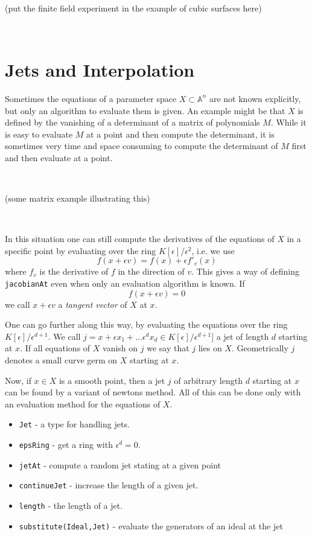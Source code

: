 \documentclass[12pt,a4paper]{amsart}
\theoremstyle{plain}
\theoremstyle{definition}
\renewcommand{\AA}{\mathbb A}
\begin{document}
\

{\color{red} (put the finite field experiment in the example of cubic surfaces here)}

\


\section{Jets and Interpolation}

Sometimes the equations of a parameter space $X \subset \AA^n$ are not known explicitly, but only an algorithm to evaluate them is given. An example might be that $X$ is defined by the vanishing of a determinant of a matrix  of polynomials $M$. While it is easy to evaluate $M$ at a point and then compute the determinant, it is sometimes very time and space consuming to compute the determinant of $M$ first and then evaluate at a point.

\

{\color{red} (some matrix example illustrating this)}

\

In this situation one can still compute the derivatives of the equations of $X$ in a specific point by evaluating over the ring $K[\epsilon]/\epsilon^2$, i.e. we use
\[
	f(x + \epsilon v) = f(x) + \epsilon f'_v(x)
\]
where $f_v$ is the derivative of $f$ in the direction of $v$. This gives a way of defining {\tt jacobianAt} even when only an evaluation algorithm is known. If
\[
	f(x + \epsilon v) = 0
\]
we call $x + \epsilon v$ a {\sl tangent vector} of $X$ at $x$.

One can go further along this way, by evaluating the equations over the ring $K[\epsilon]/\epsilon^{d+1}$. 
We call $j = x + \epsilon x_1 + \dots \epsilon^d x_d \in K[\epsilon]/\epsilon^{d+1}]$ a jet of length $d$ starting at $x$. 
If all equations of $X$ vanish on $j$ we say that $j$ lies on $X$. Geometrically $j$ denotes a small curve germ on $X$ starting at $x$.

Now, if $x \in X$ is a smooth point, then a jet $j$ of arbitrary length $d$ starting at $x$ can be found by a variant of newtons method. All of this can be done only with an evaluation method for the equations of $X$. 

\begin{itemize}
\item {\tt Jet} - a type for handling jets.
\item {\tt epsRing} - get a ring with $\epsilon^d = 0$.
\item {\tt jetAt} - compute a random jet stating at a given point
\item {\tt continueJet} - increase the length of a given jet.
\item {\tt length} - the length of a jet.
\item {\tt substitute(Ideal,Jet)} - evaluate the generators of an ideal at the jet
\end{itemize}
\end{document}
